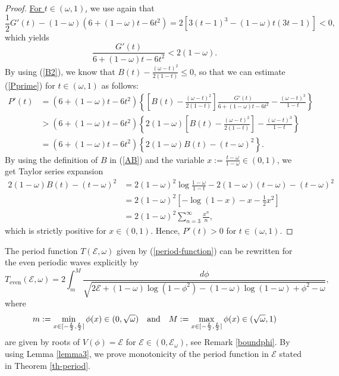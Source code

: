 \documentclass[12pt,reqno]{amsart}
\numberwithin{equation}{section}
\numberwithin{figure}{section}
\begin{document}
\begin{proof}
\underline{For $t\in (\omega,1)$,} we use again that 
		\begin{equation*}
\frac{1}{2} G'(t) - (1-\omega)(6+ (1-\omega) t - 6t^2) = 2 \left [ 3(t-1)^3 - (1-\omega ) t (3t- 1) \right ] < 0, 
		\end{equation*}
which yields 
		\begin{equation*}
		\frac{G'(t)}{6+ (1-\omega) t - 6t^2} < 2(1-\omega). 
		\end{equation*}
By using (\ref{B2}), we know that $B(t) -  \frac{(\omega - t)^2}{2(1-t)}\leq 0$, 
so that we can estimate (\ref{Pprime}) for $t \in (\omega,1)$ as follows: 
		\begin{align*}
		P'(t) &= (6 + (1-\omega) t  - 6t^2) \left \{ \left [ B(t) - \frac{(\omega-t)^2}{2(1-t)} \right ] \frac{G'(t)}{6+ (1-\omega) t - 6t^2}  -\frac{(\omega-t)^3}{1-t} \right \} \\
		& > (6 + (1-\omega) t  - 6t^2) \left \{  2(1-\omega) \left [ B(t) - \frac{(\omega-t)^2}{2(1-t)} \right ] -\frac{(\omega-t)^3}{1-t} \right \} \\
				& =  (6 + (1-\omega) t  - 6t^2) \left \{  2 (1-\omega) B(t) - (t-\omega)^2 \right \}. 
		\end{align*}
By using the definition of $B$ in (\ref{AB}) and the variable $x := \frac{t- \omega}{1-\omega} \in (0,1)$, we get Taylor series expansion 
		\begin{align*}
2 (1-\omega) B(t) - (t-\omega)^2 &= 2 (1-\omega)^2 \log\frac{1-\omega}{1-t} - 2(1-\omega) (t-\omega) - (t-\omega)^2 \\
& =  2 (1-\omega)^2 \left[ -\log(1-x) - x -\frac{1}{2} x^2 \right] \\
&= 2 (1-\omega)^2 \sum_{n=3}^{\infty} \frac{x^n}{n},
\end{align*}
which is strictly positive for $x \in (0,1)$. Hence, $P'(t) > 0$ for $t\in (\omega, 1)$. 
\end{proof}

The period function $T(\mathcal{E},\omega)$ given by (\ref{period-function}) 
can be rewritten for the even periodic waves explicitly by
\begin{equation}
\label{even-period}
T_\mathrm{even}(\mathcal E,\omega) = 2 \int_{m}^{M}\frac{d \phi }{\sqrt{2\mathcal E + (1-\omega)\log(1-\phi^2) - (1-\omega) \log(1-\omega) + \phi^2 - \omega}},
\end{equation}
where 
$$
m := \min\limits_{x\in [-\frac{L}{2},\frac{L}{2}]} \phi (x) \in (0,\sqrt{\omega}) \quad \mbox{\rm and} \quad 
M:= \max\limits_{x\in [-\frac{L}{2},\frac{L}{2}]} \phi(x)\in (\sqrt{\omega},1)
$$ 
are given by roots of 
$V(\phi) = \mathcal{E}$ for $\mathcal{E}\in (0,\mathcal{E}_{\omega})$, see Remark \ref{boundphi}. By using Lemma \ref{lemma3}, we prove monotonicity of the period function in $\mathcal{E}$ stated in Theorem \ref{th-period}.
\end{document}
